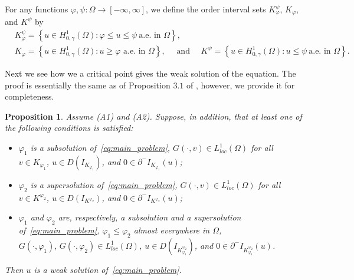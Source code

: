 \documentclass[11pt]{article}
\newtheorem{proposition}{Proposition}[section]
\newcommand{\om} {\Omega}
\newcommand{\spacegr}{H^{1}_{0,\gamma}(\Omega)}
\begin{document}
For any functions $\varphi, \psi : \Omega \to [-\infty,\infty]$, we define the order interval sets $K_{\varphi}^{\psi}$, $K_{\varphi}$, and $K^{\psi}$ by
\begin{equation*}
\begin{aligned}
&K_{\varphi}^{\psi}
= \left\{ u \in \spacegr : \varphi \le u \le \psi \ \text{a.e. in } \Omega \right\},\\
&K_{\varphi} = \left\{ u \in \spacegr : u \geq \varphi \text{ a.e. in } \om \right\}, \quad \text{ and } \quad 
K^{\psi}
= \left\{ u \in \spacegr : u \le \psi \ \text{a.e. in } \Omega \right\}.
\end{aligned}
\end{equation*}

Next we see how we a critical point gives the weak solution of the equation. The proof is essentially the same as of Proposition $3.1$ of \cite{hirano_fully_singular}, however, we provide it for completeness. 

\begin{proposition}
\label{prop:sub_super_solution_criterion}
Assume \textnormal{(A1)} and \textnormal{(A2)}. Suppose, in addition, that at least one of the following conditions is satisfied:
\begin{itemize}
  \item[(i)] $\varphi_1$ is a subsolution of~\eqref{eq:main_problem}, 
  $G(\cdot,v) \in L_{loc}^{1}(\Omega)$ for all $v \in K_{\varphi_1}$, 
  $u \in D(I_{K_{\varphi_1}})$, and $0 \in \partial^{-} I_{K_{\varphi_1}}(u)$;

  \item[(ii)] $\varphi_2$ is a supersolution of~\eqref{eq:main_problem}, 
  $G(\cdot,v) \in L_{loc}^{1}(\Omega)$ for all $v \in K^{\varphi_2}$, 
  $u \in D(I_{K^{\varphi_2}})$, and $0 \in \partial^{-} I_{K^{\varphi_2}}(u)$;

  \item[(iii)] $\varphi_1$ and $\varphi_2$ are, respectively, a subsolution and a supersolution of~\eqref{eq:main_problem}, 
  $\varphi_1 \le \varphi_2$ almost everywhere in $\Omega$, 
  $G(\cdot,\varphi_1),\, G(\cdot,\varphi_2) \in L_{loc}^{1}(\Omega)$, 
  $u \in D(I_{K_{\varphi_1}^{\varphi_2}})$, and $0 \in \partial^{-} I_{K_{\varphi_1}^{\varphi_2}}(u)$.
\end{itemize}
Then $u$ is a weak solution of~\eqref{eq:main_problem}.
\end{proposition}
\end{document}
